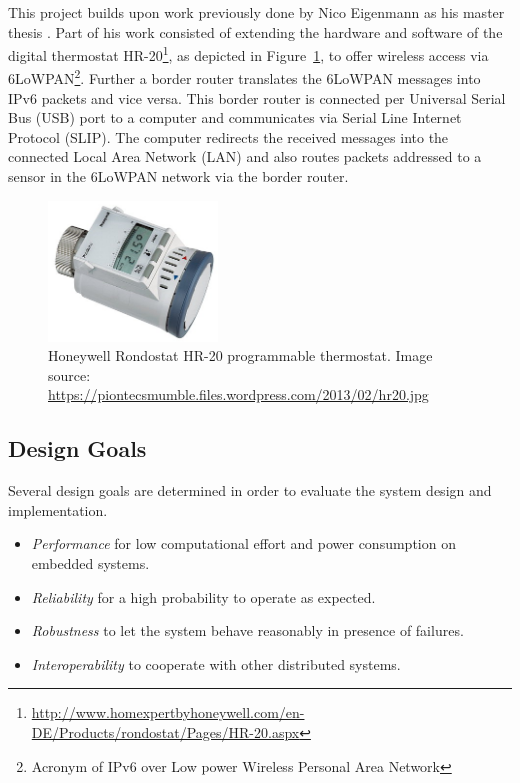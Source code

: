 This project builds upon work previously done by Nico Eigenmann as his master thesis \cite{eigenmann2012opportunisticSensing}.
Part of his work consisted of extending the hardware and software of the digital thermostat HR-20\footnote{\url{http://www.homexpertbyhoneywell.com/en-DE/Products/rondostat/Pages/HR-20.aspx}}, as depicted in Figure~\ref{fig:honeywell_hr20}, to offer wireless access via 6LoWPAN\footnote{Acronym of IPv6 over Low power Wireless Personal Area Network}.
Further a border router translates the 6LoWPAN messages into IPv6 packets and vice versa.
This border router is connected per Universal Serial Bus (USB) port to a computer and communicates via Serial Line Internet Protocol (SLIP).
The computer redirects the received messages into the connected Local Area Network (LAN) and also routes packets addressed to a sensor in the 6LoWPAN network via the border router.

\begin{figure}[h]
	\begin{center}
		\includegraphics[width=0.4\textwidth]{images/hr20.jpg}
	\end{center}
	\caption{Honeywell Rondostat HR-20 programmable thermostat. Image source: \url{https://piontecsmumble.files.wordpress.com/2013/02/hr20.jpg}}
	\label{fig:honeywell_hr20}
\end{figure}

\subsection{Design Goals}

Several design goals are determined in order to evaluate the system design and implementation.

\begin{itemize}
	\item \emph{Performance} for low computational effort and power consumption on embedded systems.
	\item \emph{Reliability} for a high probability to operate as expected.
	\item \emph{Robustness} to let the system behave reasonably in presence of failures.
	\item \emph{Interoperability} to cooperate with other distributed systems.
\end{itemize}

